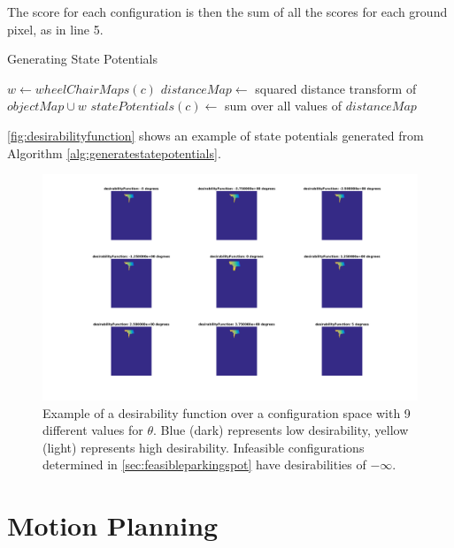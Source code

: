 The score for each configuration is then the sum of all the scores for each
ground pixel, as in line 5.

\begin{algorithm}
\caption{Generating State Potentials}
\label{alg:generatestatepotentials}
\begin{algorithmic}[1]
\Statex
{}
        \State $w \gets wheelChairMaps(c)$
        \State $distanceMap \gets$ squared distance transform of $objectMap \cup w$
        \State $statePotentials(c) \gets$ sum over all values of $distanceMap$
    \EndFor
\EndFunction
\Statex
{}
\end{algorithmic}
\end{algorithm}

\autoref{fig:desirabilityfunction} shows an example of state potentials
generated from Algorithm \autoref{alg:generatestatepotentials}.

\begin{figure}
\centering
\includegraphics[width=6in]{figures/desirabilityfunction.png}
\caption{Example of a desirability function over a configuration space with 9
different values for $\theta$. Blue (dark) represents low desirability, yellow
(light) represents high desirability. Infeasible configurations determined in 
\autoref{sec:feasibleparkingspot} have desirabilities of $-\infty$.} 
\label{fig:desirabilityfunction}
\end{figure}
\chapter{Motion Planning}
